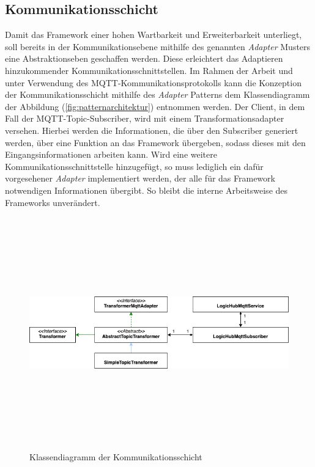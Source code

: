     \subsection{Kommunikationsschicht}
    Damit das Framework einer hohen Wartbarkeit und Erweiterbarkeit unterliegt, soll bereits in der Kommunikationsebene mithilfe 
    des genannten \textit{Adapter} Musters eine Abstraktionseben geschaffen werden. Diese erleichtert das Adaptieren 
    hinzukommender Kommunikationsschnittstellen. Im Rahmen der Arbeit und unter Verwendung des \acs{MQTT}-Kommunikationsprotokolls kann die 
    Konzeption der Kommunikationsschicht mithilfe des \textit{Adapter} Patterns dem Klassendiagramm der Abbildung (\ref{fig:patternarchitektur}) entnommen werden. 
    Der Client, in dem Fall der \acs{MQTT}-Topic-Subscriber, wird mit einem Transformationsadapter versehen. Hierbei werden die 
    Informationen, die über den Subscriber generiert werden, über eine Funktion an das Framework übergeben, sodass dieses mit den Eingangsinformationen arbeiten kann. 
    Wird eine weitere Kommunikationsschnittstelle hinzugefügt, so muss lediglich ein dafür vorgesehener \textit{Adapter} implementiert werden, der 
    alle für das Framework notwendigen Informationen übergibt. So bleibt die interne Arbeitsweise des Frameworks unverändert.
    \begin{figure}[hbt!]
        \centering
        \includegraphics[width=14cm,height=10cm,keepaspectratio]{images/Kommunikationsschicht_final.png}
        \caption{Klassendiagramm der Kommunikationsschicht}
        \label{fig:patternkommunikation}
    \end{figure}
